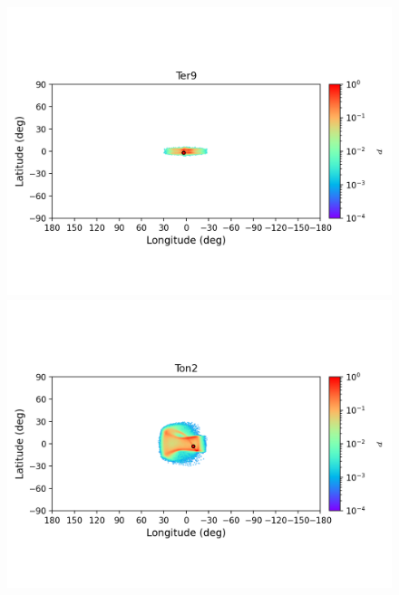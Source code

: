 \begin{figure}
\begin{center}
                \includegraphics[clip=true, trim = 0mm 20mm 0mm 10mm, width=1\columnwidth]{images/error_plots_Ter9.png}
                \includegraphics[clip=true, trim = 0mm 20mm 0mm 10mm, width=1\columnwidth]{images/error_plots_Ton2.png}
                

\end{center}
\end{figure}
